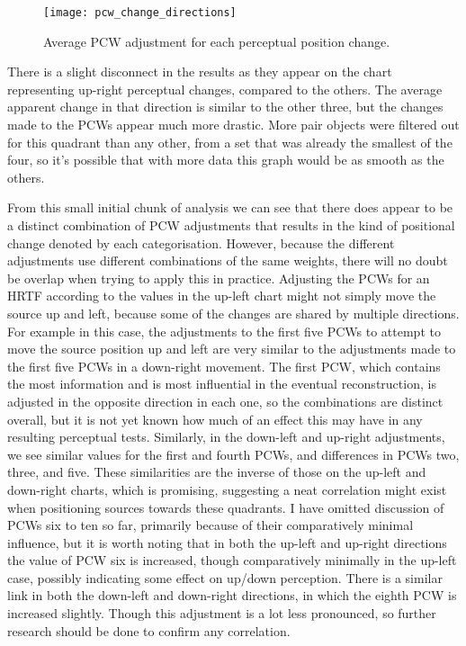 \begin{figure}
	\caption{Average PCW adjustment for each perceptual position change.}
	\centering
		\texttt{[image: pcw\_change\_directions]}
	
\end{figure}

There is a slight disconnect in the results as they appear on the chart representing up-right perceptual changes, compared to the others. The average apparent change in that direction is similar to the other three, but the changes made to the PCWs appear much more drastic. More pair objects were filtered out for this quadrant than any other, from a set that was already the smallest of the four, so it's possible that with more data this graph would be as smooth as the others. 

From this small initial chunk of analysis we can see that there does appear to be a distinct combination of PCW adjustments that results in the kind of positional change denoted by each categorisation. However, because the different adjustments use different combinations of the same weights, there will no doubt be overlap when trying to apply this in practice. Adjusting the PCWs for an HRTF according to the values in the up-left chart might not simply move the source up and left, because some of the changes are shared by multiple directions. For example in this case, the adjustments to the first five PCWs to attempt to move the source position up and left are very similar to the adjustments made to the first five PCWs in a down-right movement. The first PCW, which contains the most information and is most influential in the eventual reconstruction, is adjusted in the opposite direction in each one, so the combinations are distinct overall, but it is not yet known how much of an effect this may have in any resulting perceptual tests. Similarly, in the down-left and up-right adjustments, we see similar values for the first and fourth PCWs, and differences in PCWs two, three, and five. These similarities are the inverse of those on the up-left and down-right charts, which is promising, suggesting a neat correlation might exist when positioning sources towards these quadrants. I have omitted discussion of PCWs six to ten so far, primarily because of their comparatively minimal influence, but it is worth noting that in both the up-left and up-right directions the value of PCW six is increased, though comparatively minimally in the up-left case, possibly indicating some effect on up/down perception. There is a similar link in both the down-left and down-right directions, in which the eighth PCW is increased slightly. Though this adjustment is a lot less pronounced, so further research should be done to confirm any correlation.